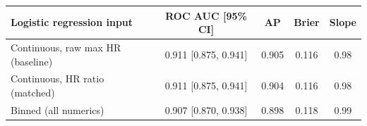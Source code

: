 \begin{tabular}{lcccc}
\toprule
Logistic regression input & ROC AUC [95\% CI] & AP & Brier & Slope \\
\midrule
Continuous, raw max HR (baseline) & 0.911 [0.875, 0.941] & 0.905 & 0.116 & 0.98 \\
Continuous, HR ratio (matched) & 0.911 [0.875, 0.941] & 0.904 & 0.116 & 0.98 \\
Binned (all numerics) & 0.907 [0.870, 0.938] & 0.898 & 0.118 & 0.99 \\
\bottomrule
\end{tabular}
